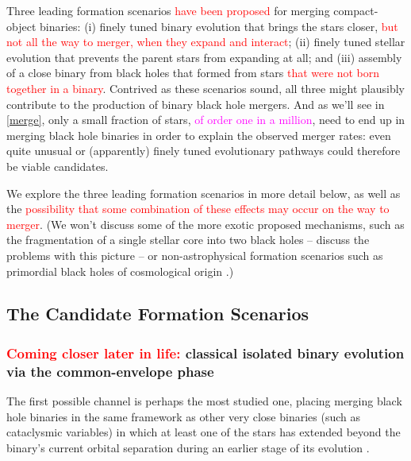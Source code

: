 \documentclass[iop,onecolumn]{revtex4}
\newcommand{\ajf}[1]{\textcolor{red}{#1}}
\newcommand{\ilya}[1]{\textcolor{magenta}{#1}}
\begin{document}
Three leading formation scenarios \ajf{have been proposed} for merging compact-object binaries: (i) finely tuned binary evolution that brings the stars closer, \ajf{but not all the way to merger, when they expand and interact}; (ii) finely tuned stellar evolution that prevents the parent stars from expanding at all; and (iii) assembly of a close binary from black holes that formed from stars \ajf{that were not born together in a binary}. Contrived as these scenarios sound, all three might plausibly contribute to the production of binary black hole mergers.  And as we'll see in \autoref{merge}, only a small fraction of stars, \ilya{of order one in a million}, need to end up in merging black hole binaries in order to explain the observed merger rates: even quite unusual or (apparently) finely tuned evolutionary pathways could therefore be viable candidates.

We explore the three leading formation scenarios in more detail below, as well as the \ajf{possibility that some combination of these effects may occur on the way to merger}. (We won't discuss some of the more exotic proposed mechanisms, such as the fragmentation of a single stellar core into two black holes \citep{Loeb:2016} -- \citet{Woosley:2016,Dai:2017} discuss the problems with this picture -- or non-astrophysical formation scenarios such as primordial black holes of cosmological origin \citep[e.g.,][]{Bird:2016}.)

\subsection{The Candidate Formation Scenarios}
\subsubsection{\ajf{Coming closer later in life:} classical isolated binary evolution via the common-envelope phase}
\label{form:isol}

The first possible channel is perhaps the most studied one, placing merging black hole binaries in the same framework as other very close binaries (such as cataclysmic variables) in which at least one of the stars has extended beyond the binary's current orbital separation during an earlier stage of its evolution \citep[e.g.,][]{Paczynski:1976}. 
\end{document}
